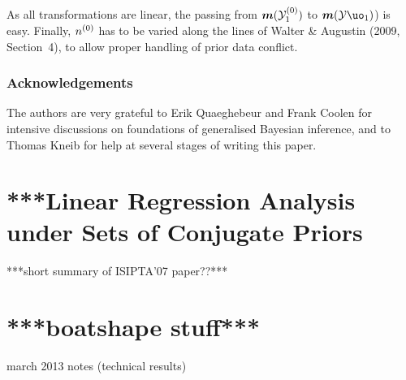 As all transformations are linear, the passing from $\boldsymbol{m}({\cal Y}^{(0)}_1)$ to $\bs{m}({\cal Y}\uo_1)$) is easy.
Finally, $n^{(0)}$ has to be varied along the lines of Walter \& Augustin (2009, Section~4), to allow proper handling of prior data conflict.
\fi

\subsubsection*{Acknowledgements}

The authors are very grateful to Erik Quaeghebeur and Frank Coolen for intensive discussions on foundations of generalised Bayesian
inference, and to Thomas Kneib for help at several stages of writing this paper.


\section{***Linear Regression Analysis under Sets of Conjugate Priors}

***short summary of ISIPTA'07 paper??***


\section{***boatshape stuff***}


march 2013 notes (technical results)


